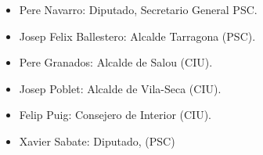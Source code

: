 \begin{itemize}

\item Pere Navarro: Diputado, Secretario General PSC.
\item Josep Felix Ballestero: Alcalde Tarragona (PSC).
\item Pere Granados: Alcalde de Salou (CIU).
\item Josep Poblet: Alcalde de Vila-Seca (CIU).
\item Felip Puig: Consejero de Interior (CIU).
\item Xavier Sabate: Diputado, (PSC)

\end{itemize}

